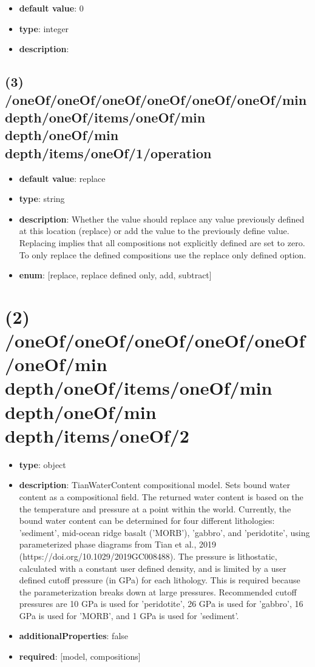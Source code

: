 \begin{itemize}[leftmargin=4em]\item {\bf default value}: 0
\item {\bf type}: integer
\item {\bf description}: 
\end{itemize}\subsection{(3) /oneOf/oneOf/oneOf/oneOf/oneOf/oneOf/min depth/oneOf/items/oneOf/min depth/oneOf/min depth/items/oneOf/1/operation}
\begin{itemize}[leftmargin=3em]\item {\bf default value}: replace
\item {\bf type}: string
\item {\bf description}: Whether the value should replace any value previously defined at this location (replace) or add the value to the previously define value. Replacing implies that all compositions not explicitly defined are set to zero. To only replace the defined compositions use the replace only defined option.
\item {\bf enum}: [replace, replace defined only, add, subtract]\end{itemize}\section{(2) /oneOf/oneOf/oneOf/oneOf/oneOf/oneOf/min depth/oneOf/items/oneOf/min depth/oneOf/min depth/items/oneOf/2}
\begin{itemize}[leftmargin=2em]\item {\bf type}: object
\item {\bf description}: TianWaterContent compositional model. Sets bound water content as a compositional field. The returned water content is based on the the temperature and pressure at a point within the world. Currently, the bound water content can be determined for four different lithologies: 'sediment', mid-ocean ridge basalt ('MORB'), 'gabbro', and 'peridotite', using parameterized phase diagrams from Tian et al., 2019 (https://doi.org/10.1029/2019GC008488). The pressure is lithostatic, calculated with a constant user defined density, and is limited by a user defined cutoff pressure (in GPa) for each lithology. This is required because the parameterization breaks down at large pressures. Recommended cutoff pressures are 10 GPa is used for 'peridotite', 26 GPa is used for 'gabbro', 16 GPa is used for 'MORB', and 1 GPa is used for 'sediment'.
\item {\bf additionalProperties}: false
\item {\bf required}: [model, compositions]\end{itemize}
